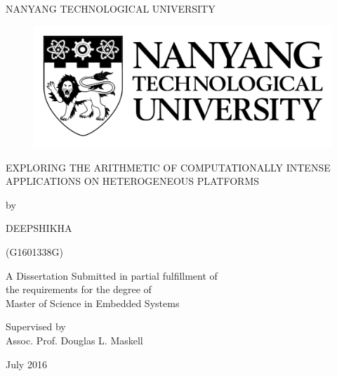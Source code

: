 \begin{titlepage}
\begin{center}
{\LARGE {NANYANG TECHNOLOGICAL UNIVERSITY}}
\begin{figure}[!t]
\centering
\includegraphics[width= 8 cm]{figures/ntulogo.pdf}
\end{figure} 
\vspace*{0.7in}
{\large EXPLORING THE ARITHMETIC OF COMPUTATIONALLY INTENSE APPLICATIONS ON HETEROGENEOUS PLATFORMS}
\par
\vspace{0.4 in}
{\large by\\}
\vspace{0.2 in}
{\large DEEPSHIKHA

(G1601338G)}
\vspace{0.1 in}
\par
\vfill
A Dissertation Submitted in partial fulfillment of \\ the requirements for the degree of \\ Master of Science in Embedded Systems
\par
\vspace{0.4in}
Supervised by\\
\vspace{0.1in}
{\large Assoc. Prof. Douglas L. Maskell \\}
\par
\vspace{0.15in}
July 2016
\end{center}
\end{titlepage}